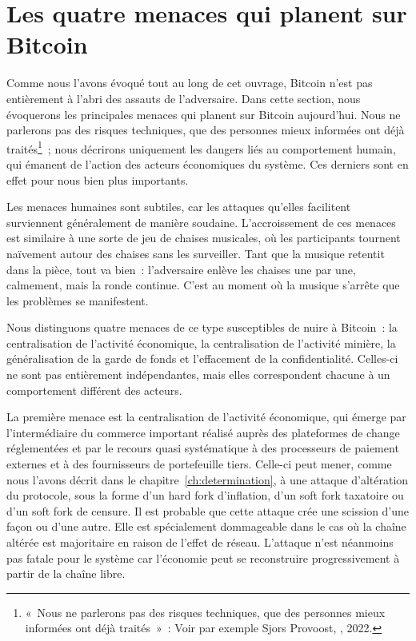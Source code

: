 
\section*{Les quatre menaces qui planent sur Bitcoin}

Comme nous l'avons évoqué tout au long de cet ouvrage, Bitcoin n'est pas entièrement à l'abri des assauts de l'adversaire. Dans cette section, nous évoquerons les principales menaces qui planent sur Bitcoin aujourd'hui. Nous ne parlerons pas des risques techniques, que des personnes mieux informées ont déjà traités\footnote{«~Nous ne parlerons pas des risques techniques, que des personnes mieux informées ont déjà traités~»~: Voir par exemple Sjors Provoost, , 2022.}~; nous décrirons uniquement les dangers liés au comportement humain, qui émanent de l'action des acteurs économiques du système. Ces derniers sont en effet pour nous bien plus importants.

Les menaces humaines sont subtiles, car les attaques qu'elles facilitent surviennent généralement de manière soudaine. L'accroissement de ces menaces est similaire à une sorte de jeu de chaises musicales, où les participants tournent naïvement autour des chaises sans les surveiller. Tant que la musique retentit dans la pièce, tout va bien~: l'adversaire enlève les chaises une par une, calmement, mais la ronde continue. C'est au moment où la musique s'arrête que les problèmes se manifestent.

Nous distinguons quatre menaces de ce type susceptibles de nuire à Bitcoin~: la centralisation de l'activité économique, la centralisation de l'activité minière, la généralisation de la garde de fonds et l'effacement de la confidentialité. Celles-ci ne sont pas entièrement indépendantes, mais elles correspondent chacune à un comportement différent des acteurs.

La première menace est la centralisation de l'activité économique, qui émerge par l'intermédiaire du commerce important réalisé auprès des plateformes de change réglementées et par le recours quasi systématique à des processeurs de paiement externes et à des fournisseurs de portefeuille tiers. Celle-ci peut mener, comme nous l'avons décrit dans le chapitre~\ref{ch:determination}, à une attaque d'altération du protocole, sous la forme d'un hard fork d'inflation, d'un soft fork taxatoire ou d'un soft fork de censure. Il est probable que cette attaque crée une scission d'une façon ou d'une autre. Elle est spécialement dommageable dans le cas où la chaîne altérée est majoritaire en raison de l'effet de réseau. L'attaque n'est néanmoins pas fatale pour le système car l'économie peut se reconstruire progressivement à partir de la chaîne libre.

